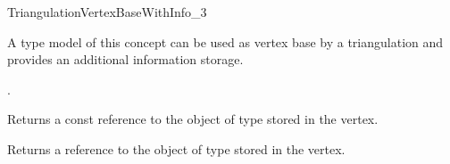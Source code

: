 

\begin{ccRefConcept}{TriangulationVertexBaseWithInfo_3}


\ccDefinition
A type model of this concept can be used as vertex base by a triangulation
and provides an additional information storage.



\ccTypes
{}
{.} 



\ccAccessFunctions
{}

{Returns a const reference to the object of type  stored in the
vertex.} 


{Returns a reference to the object of type  stored in the vertex.} 

\ccHasModels


\end{ccRefConcept}
